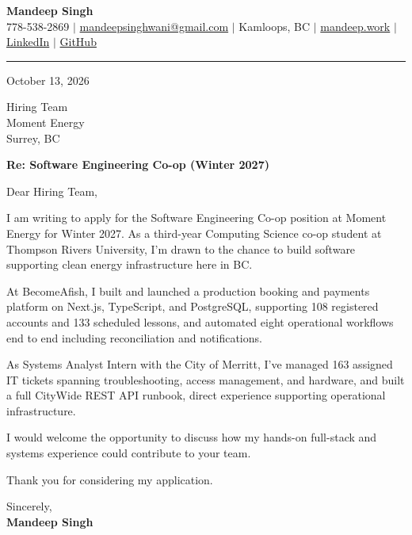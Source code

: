 \documentclass[letterpaper,11pt]{article}
\begin{document}
\begin{center}
    \textbf{\LARGE Mandeep Singh} \\ \vspace{2pt}
    \small 778-538-2869 $|$
    \href{mailto:mandeepsinghwani@gmail.com}{mandeepsinghwani@gmail.com} $|$
    Kamloops, BC $|$
    \href{https://mandeep.work}{mandeep.work} $|$
    \href{https://www.linkedin.com/in/mandeep-singh-b855972a7/}{LinkedIn} $|$
    \href{https://github.com/deepmroot}{GitHub}
\end{center}

\vspace{4pt}
\hrule
\vspace{14pt}

October 13, 2026

\vspace{8pt}
Hiring Team \\
Moment Energy \\
Surrey, BC

\vspace{8pt}
\textbf{Re: Software Engineering Co-op (Winter 2027)}

\vspace{10pt}
Dear Hiring Team,

\vspace{4pt}
I am writing to apply for the Software Engineering Co-op position at Moment Energy for Winter 2027. As a third-year Computing Science co-op student at Thompson Rivers University, I'm drawn to the chance to build software supporting clean energy infrastructure here in BC.

At BecomeAfish, I built and launched a production booking and payments platform on Next.js, TypeScript, and PostgreSQL, supporting 108 registered accounts and 133 scheduled lessons, and automated eight operational workflows end to end including reconciliation and notifications.

As Systems Analyst Intern with the City of Merritt, I've managed 163 assigned IT tickets spanning troubleshooting, access management, and hardware, and built a full CityWide REST API runbook, direct experience supporting operational infrastructure.

I would welcome the opportunity to discuss how my hands-on full-stack and systems experience could contribute to your team.

Thank you for considering my application.

\vspace{16pt}
Sincerely, \\
\vspace{6pt}
\textbf{Mandeep Singh}
\end{document}

